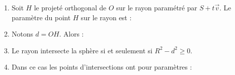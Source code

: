 \documentclass[11pt,class=report,crop=false]{standalone}
\begin{document}
\begin{proposition}
\sauteligne
\begin{enumerate}
  \item Soit $H$ le projeté orthogonal de $O$ sur le rayon paramétré par $S + t\vec v$. Le paramètre du point $H$ sur le rayon est :

  \item Notons $d = OH$. Alors :
  
  \item Le rayon intersecte la sphère si et seulement si $R^2-d^2 \ge 0$.

  \item Dans ce cas les points d'intersections ont pour paramètres :
\end{enumerate}
\end{proposition}

\end{document}
